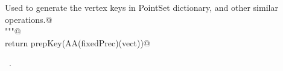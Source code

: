 \documentclass[11pt,oneside]{article}	%
\begin{document}
\begin{flushleft}
\begin{minipage}{\linewidth}
\begin{list}{}{}
\mbox{}\verb@   Used to generate the vertex keys in PointSet dictionary, and other similar operations.@\\
\mbox{}\verb@   """@\\
\mbox{}\verb@   return prepKey(AA(fixedPrec)(vect))@\\
\mbox{}\verb@@{\NWsep}
\end{list}
\vspace{-1ex}
\footnotesize\addtolength{\baselineskip}{-1ex}
\begin{list}{}{\setlength{\itemsep}{-\parsep}\setlength{\itemindent}{-\leftmargin}}
\item \NWtxtMacroRefIn\ .
\end{list}
\end{minipage}\\[4ex]
\end{flushleft}






\end{document}
